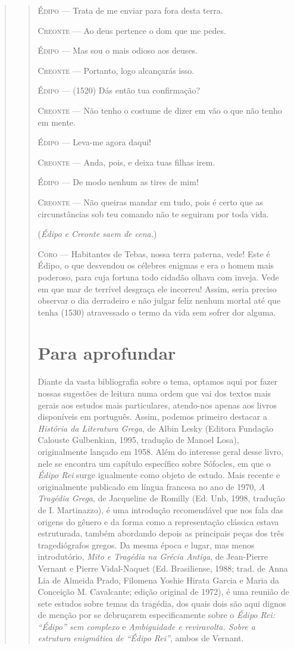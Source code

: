 \begin{verse}
\begin{verse}
\textsc{Édipo} --- Trata de me enviar para fora desta terra.

\textsc{Creonte} --- Ao deus pertence o dom que me pedes.

\textsc{Édipo} --- Mas sou o mais odioso aos deuses.

\textsc{Creonte} --- Portanto, logo alcançarás isso.

\textsc{Édipo} --- (1520) Dás então tua confirmação?

\textsc{Creonte} --- Não tenho o costume de dizer em vão o que não tenho em mente.

\textsc{Édipo} --- Leva-me agora daqui!

\textsc{Creonte} --- Anda, pois, e deixa tuas filhas irem.

\textsc{Édipo} --- De modo nenhum as tires de mim!

\textsc{Creonte} --- Não queiras mandar em tudo, pois é certo que as circunstâncias sob teu
comando não te seguiram por toda vida.

(\emph{Édipo e Creonte saem de cena.})

\textsc{Coro} --- Habitantes de Tebas, nossa terra paterna, vede! Este é Édipo, o que
desvendou os célebres enigmas e era o homem mais poderoso, para cuja
fortuna todo cidadão olhava com inveja. Vede em que mar de terrível
desgraça ele incorreu! Assim, seria preciso observar o dia derradeiro e
não julgar feliz nenhum mortal até que tenha (1530) atravessado o termo
da vida sem sofrer dor alguma.

\chapter{Para aprofundar}

Diante da vasta bibliografia sobre o tema, optamos aqui por fazer nossas
sugestões de leitura numa ordem que vai dos textos mais gerais aos
estudos mais particulares, atendo-nos apenas aos livros disponíveis em
português. Assim, podemos primeiro destacar a \emph{História da
Literatura Grega}, de Albin Lesky (Editora Fundação Calouste
Gulbenkian, 1995, tradução de Manoel Losa), originalmente lançado em
1958. Além do interesse geral desse livro, nele se encontra um capítulo
específico sobre Sófocles, em que o \emph{Édipo Rei} surge igualmente
como objeto de estudo. Mais recente e originalmente publicado em língua
francesa no ano de 1970, \emph{A Tragédia Grega}, de Jacqueline
de Romilly (Ed. Unb, 1998, tradução de I. Martinazzo), é uma introdução
recomendável que nos fala das origens do gênero e da forma como a
representação clássica estava estruturada, também abordando depois as
principais peças dos três tragediógrafos gregos. Da mesma época e lugar,
mas menos introdutório, \emph{Mito e Tragédia na Grécia
Antiga}, de Jean-Pierre Vernant e Pierre Vidal-Naquet (Ed. Brasiliense,
1988; trad. de Anna Lia de Almeida Prado, Filomena Yoshie Hirata Garcia
e Maria da Conceição M. Cavalcante; edição original de 1972), é uma
reunião de sete estudos sobre temas da tragédia, dos quais dois são aqui
dignos de menção por se debruçarem especificamente sobre o \emph{Édipo
Rei: ``Édipo'' sem complexo} e \emph{Ambiguidade e reviravolta.
Sobre a estrutura enigmática de ``Édipo Rei''}, ambos de Vernant.


\end{verse}
\end{verse}
